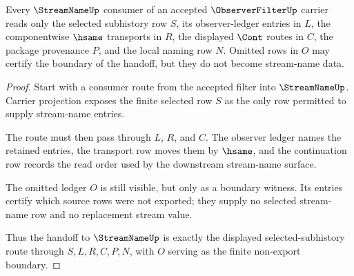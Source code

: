 \begin{theorem}
\label{thm:observer-filter-streamname-handoff}
Every $\StreamNameUp$ consumer of an accepted $\ObserverFilterUp$ carrier reads only the selected subhistory row $S$, its observer-ledger entries in $L$, the componentwise $\hsame$ transports in $R$, the displayed $\Cont$ routes in $C$, the package provenance $P$, and the local naming row $N$. Omitted rows in $O$ may certify the boundary of the handoff, but they do not become stream-name data.
\end{theorem}
\begin{proof}
Start with a consumer route from the accepted filter into $\StreamNameUp$. Carrier projection exposes the finite selected row $S$ as the only row permitted to supply stream-name entries.

The route must then pass through $L$, $R$, and $C$. The observer ledger names the retained entries, the transport row moves them by $\hsame$, and the continuation row records the read order used by the downstream stream-name surface.

The omitted ledger $O$ is still visible, but only as a boundary witness. Its entries certify which source rows were not exported; they supply no selected stream-name row and no replacement stream value.

Thus the handoff to $\StreamNameUp$ is exactly the displayed selected-subhistory route through $S,L,R,C,P,N$, with $O$ serving as the finite non-export boundary.
\end{proof}

